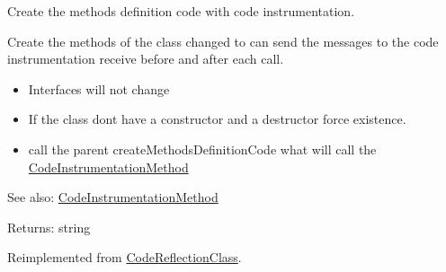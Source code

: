 Create the methods definition code with code instrumentation.

Create the methods of the class changed to can send the messages to the code instrumentation receive before and after each call.

\begin{itemize}
\item Interfaces will not change\item If the class dont have a constructor and a destructor force existence.\item call the parent createMethodsDefinitionCode what will call the \hyperlink{class_code_instrumentation_method}{CodeInstrumentationMethod}\end{itemize}


\begin{Desc}
\item[See also:]\hyperlink{class_code_instrumentation_method}{CodeInstrumentationMethod} \end{Desc}
\begin{Desc}
\item[Returns:]string \end{Desc}


Reimplemented from \hyperlink{class_code_reflection_class_c2d23f8614e24561b794d5031001eaf8}{CodeReflectionClass}.

